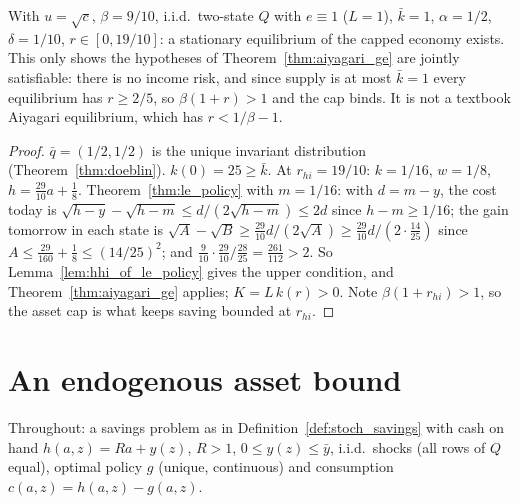 \begin{theorem}
\label{thm:sqrt_equilibrium}
\leanok
{}
With $u=\sqrt c$, $\beta = 9/10$, i.i.d.\ two-state $Q$ with $e\equiv1$ ($L=1$), $\bar k = 1$, $\alpha=1/2$,
$\delta = 1/10$, $r\in[0,19/10]$: a stationary equilibrium of the capped economy exists. This only shows the
hypotheses of Theorem~\ref{thm:aiyagari_ge} are jointly satisfiable: there is no income risk, and since supply is at
most $\bar k=1$ every equilibrium has $r\ge 2/5$, so $\beta(1+r)>1$ and the cap binds. It is not a textbook Aiyagari
equilibrium, which has $r<1/\beta-1$.
\end{theorem}
\begin{proof}
\leanok
{}
$\bar q = (1/2,1/2)$ is the unique invariant distribution (Theorem~\ref{thm:doeblin}). $k(0) = 25 \ge \bar k$.
At $r_{hi} = 19/10$: $k = 1/16$, $w = 1/8$, $h = \tfrac{29}{10}a + \tfrac18$. Theorem~\ref{thm:le_policy} with
$m = 1/16$: with $d = m-y$, the cost today is $\sqrt{h-y}-\sqrt{h-m} \le d/(2\sqrt{h-m}) \le 2d$ since $h-m\ge1/16$;
the gain tomorrow in each state is $\sqrt A - \sqrt B \ge \tfrac{29}{10}d/(2\sqrt A) \ge \tfrac{29}{10}d/(2\cdot\tfrac{14}{25})$
since $A \le \tfrac{29}{160}+\tfrac18 \le (14/25)^2$; and $\tfrac{9}{10}\cdot\tfrac{29}{10}/\tfrac{28}{25} =
\tfrac{261}{112} > 2$. So Lemma~\ref{lem:hhi_of_le_policy} gives the upper condition, and
Theorem~\ref{thm:aiyagari_ge} applies; $K = L\,k(r) > 0$. Note $\beta(1+r_{hi}) > 1$, so the asset cap is what keeps
saving bounded at $r_{hi}$.
\end{proof}

\section{An endogenous asset bound}
\label{sec:asset_bound}

Throughout: a savings problem as in Definition~\ref{def:stoch_savings} with cash on hand $h(a,z) = Ra + y(z)$,
$R>1$, $0\le y(z)\le\bar y$, i.i.d.\ shocks (all rows of $Q$ equal), optimal policy $g$ (unique, continuous) and
consumption $c(a,z) = h(a,z) - g(a,z)$.

